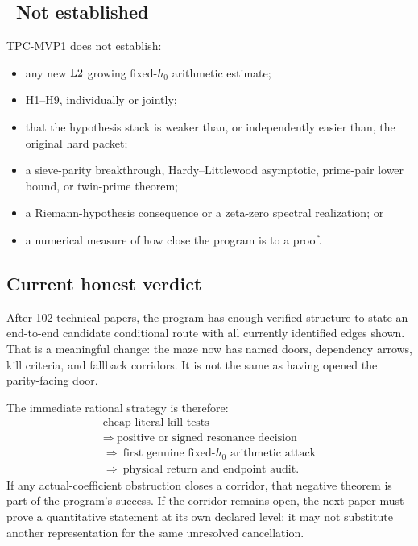 \subsection*{\Ntag\ Not established}

TPC-MVP1 does not establish:
\begin{itemize}[leftmargin=2em]
\item any new \(\mathrm{L2}\) growing fixed-\(h_0\) arithmetic estimate;
\item H1--H9, individually or jointly;
\item that the hypothesis stack is weaker than, or independently
  easier than, the original hard packet;
\item a sieve-parity breakthrough, Hardy--Littlewood asymptotic,
  prime-pair lower bound, or twin-prime theorem;
\item a Riemann-hypothesis consequence or a zeta-zero spectral
  realization; or
\item a numerical measure of how close the program is to a proof.
\end{itemize}

\subsection*{Current honest verdict}

After 102 technical papers, the program has enough verified structure
to state an end-to-end candidate conditional route with all currently
identified edges shown.  That is a meaningful change: the maze now
has named doors, dependency arrows, kill criteria, and fallback
corridors.  It is not the same as having opened the parity-facing
door.

The immediate rational strategy is therefore:
\[
\begin{gathered}
\text{cheap literal kill tests}\\[-0.2em]
\Longrightarrow\ \text{positive or signed resonance decision}\\[-0.2em]
\Longrightarrow\ \text{first genuine fixed-\(h_0\) arithmetic attack}\\[-0.2em]
\Longrightarrow\ \text{physical return and endpoint audit}.
\end{gathered}
\]
If any actual-coefficient obstruction closes a corridor, that negative
theorem is part of the program's success.  If the corridor remains
open, the next paper must prove a quantitative statement at its own
declared level; it may not substitute another representation for the
same unresolved cancellation.
